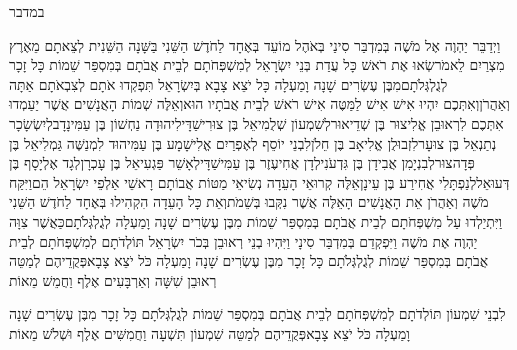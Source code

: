 \documentclass[../main/main.tex]{subfiles}
\begin{document}
\Incipit{}במדבר\par
\vspace{\afterchapskip}
\RTLmulticolcolumns
\begin{multicols}{\ncols}
וַיְדַבֵּר יַהְוֶה אֶל מֹשֶׁה בְּמִדְבַּר סִינַי בְּאֹהֶל מוֹעֵד בְּאֶחָד לַחֹדֶשׁ הַשֵּׁנִי בַּשָּׁנָה הַשֵּׁנִית לְצֵאתָם מֵאֶרֶץ מִצְרַיִם לֵאמֹר\PreVerseSpace{}שְׂאוּ אֶת רֹאשׁ כָּל עֲדַת בְּנֵי יִשְׂרָאֵל לְמִשְׁפְּחֹתָם לְבֵית אֲבֹתָם בְּמִסְפַּר שֵׁמוֹת כָּל זָכָר לְגֻלְגְּלֹתָם\PreVerseSpace{}מִבֶּן עֶשְׂרִים שָׁנָה וָמַעְלָה כָּל יֹצֵא צָבָא בְּיִשְׂרָאֵל תִּפְקְדוּ אֹתָם לְצִבְאֹתָם אַתָּה וְאַהֲרֹן\PreVerseSpace{}וְאִתְּכֶם יִהְיוּ אִישׁ אִישׁ לַמַּטֶּה אִישׁ רֹאשׁ לְבֵית אֲבֹתָיו הוּא\PreVerseSpace{}וְאֵלֶּה שְׁמוֹת הָאֲנָשִׁים אֲשֶׁר יַעַמְדוּ אִתְּכֶם לִרְאוּבֵן אֱלִיצוּר בֶּן שְׁדֵיאוּר\PreVerseSpace{}לְשִׁמְעוֹן שְׁלֻמִיאֵל בֶּן צוּרִישַׁדָּי\PreVerseSpace{}לִיהוּדָה נַחְשׁוֹן בֶּן עַמִּינָדָב\PreVerseSpace{}לְיִשְׂשָׂכָר נְתַנְאֵל בֶּן צוּעָר\PreVerseSpace{}לִזְבוּלֻן אֱלִיאָב בֶּן חֵלֹן\PreVerseSpace{}לִבְנֵי יוֹסֵף לְאֶפְרַיִם אֱלִישָׁמָע בֶּן עַמִּיהוּד לִמְנַשֶּׁה גַּמְלִיאֵל בֶּן פְּדָהצוּר\PreVerseSpace{}לְבִנְיָמִן אֲבִידָן בֶּן גִּדְעֹנִי\PreVerseSpace{}לְדָן אֲחִיעֶזֶר בֶּן עַמִּישַׁדָּי\PreVerseSpace{}לְאָשֵׁר פַּגְעִיאֵל בֶּן עָכְרָן\PreVerseSpace{}לְגָד אֶלְיָסָף בֶּן דְּעוּאֵל\PreVerseSpace{}לְנַפְתָּלִי אֲחִירַע בֶּן עֵינָן\PreVerseSpace{}אֵלֶּה קְרוּאֵי\SubEnd{} הָעֵדָה נְשִׂיאֵי מַטּוֹת אֲבוֹתָם רָאשֵׁי אַלְפֵי יִשְׂרָאֵל הֵם\PreVerseSpace{}וַיִּקַּח מֹשֶׁה וְאַהֲרֹן אֵת הָאֲנָשִׁים הָאֵלֶּה אֲשֶׁר נִקְּבוּ בְּשֵׁמֹת\PreVerseSpace{}וְאֵת כָּל הָעֵדָה הִקְהִילוּ בְּאֶחָד לַחֹדֶשׁ הַשֵּׁנִי וַיִּתְיַלְדוּ עַל מִשְׁפְּחֹתָם לְבֵית אֲבֹתָם בְּמִסְפַּר שֵׁמוֹת מִבֶּן עֶשְׂרִים שָׁנָה וָמַעְלָה לְגֻלְגְּלֹתָם\PreVerseSpace{}כַּאֲשֶׁר צִוָּה יַהְוֶה אֶת מֹשֶׁה וַיִּפְקְדֵם בְּמִדְבַּר סִינָי \ClosedSection{}וַיִּהְיוּ בְנֵי רְאוּבֵן בְּכֹר יִשְׂרָאֵל תּוֹלְדֹתָם לְמִשְׁפְּחֹתָם לְבֵית אֲבֹתָם בְּמִסְפַּר שֵׁמוֹת לְגֻלְגְּלֹתָם כָּל זָכָר מִבֶּן עֶשְׂרִים שָׁנָה וָמַעְלָה כֹּל יֹצֵא צָבָא\PreVerseSpace{}פְּקֻדֵיהֶם לְמַטֵּה רְאוּבֵן שִׁשָּׁה וְאַרְבָּעִים אֶלֶף וַחֲמֵשׁ מֵאוֹת\OpenSection{}\par
{}לִבְנֵי שִׁמְעוֹן תּוֹלְדֹתָם לְמִשְׁפְּחֹתָם לְבֵית אֲבֹתָם  בְּמִסְפַּר שֵׁמוֹת לְגֻלְגְּלֹתָם כָּל זָכָר מִבֶּן עֶשְׂרִים שָׁנָה וָמַעְלָה כֹּל יֹצֵא צָבָא\PreVerseSpace{}פְּקֻדֵיהֶם לְמַטֵּה שִׁמְעוֹן תִּשְׁעָה וַחֲמִשִּׁים אֶלֶף וּשְׁלֹשׁ מֵאוֹת\OpenSection{}\par

\end{multicols}
\end{document}
